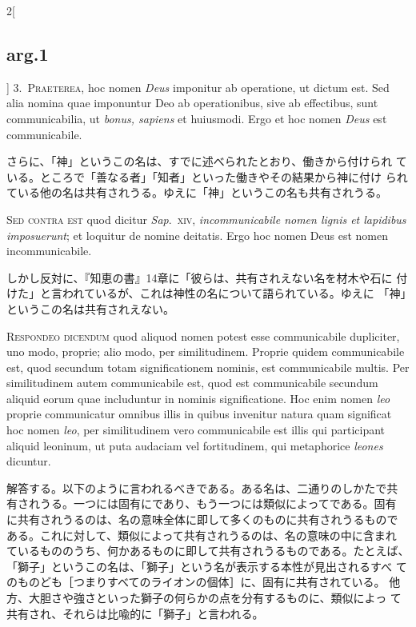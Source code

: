 \documentclass[paper=a4paper,fontsize=10pt,jafontsize=9pt,titlepage]{jlreq}
\begin{document}
\begin{paracol}{2}[\subsection{arg.1}]
3.~{\scshape Praeterea}, hoc nomen {\itshape Deus} imponitur ab
operatione, ut dictum est. Sed alia nomina quae imponuntur Deo ab
operationibus, sive ab effectibus, sunt communicabilia, ut {\itshape
bonus, sapiens} et huiusmodi. Ergo et hoc nomen {\itshape Deus} est
communicabile.

\switchcolumn

さらに、「神」というこの名は、すでに述べられたとおり、働きから付けられ
ている。ところで「善なる者」「知者」といった働きやその結果から神に付け
られている他の名は共有されうる。ゆえに「神」というこの名も共有されうる。

\switchcolumn*[\subsection{s.c.}]

{\scshape Sed contra est} quod dicitur {\itshape Sap}.~{\scshape xiv},
{\itshape incommunicabile nomen lignis et lapidibus imposuerunt}; et
loquitur de nomine deitatis. Ergo hoc nomen Deus est nomen
incommunicabile.

\switchcolumn

しかし反対に、『知恵の書』14章に「彼らは、共有されえない名を材木や石に
付けた」と言われているが、これは神性の名について語られている。ゆえに
「神」というこの名は共有されえない。


{\scshape Respondeo dicendum} quod aliquod nomen potest esse
communicabile dupliciter, uno modo, proprie; alio modo, per
similitudinem. Proprie quidem communicabile est, quod secundum totam
significationem nominis, est communicabile multis. Per similitudinem
autem communicabile est, quod est communicabile secundum aliquid eorum
quae includuntur in nominis significatione. Hoc enim nomen {\itshape
leo} proprie communicatur omnibus illis in quibus invenitur natura
quam significat hoc nomen {\itshape leo}, per similitudinem vero
communicabile est illis qui participant aliquid leoninum, ut puta
audaciam vel fortitudinem, qui metaphorice {\itshape leones} dicuntur.

\switchcolumn

解答する。以下のように言われるべきである。ある名は、二通りのしかたで共
有されうる。一つには固有にであり、もう一つには類似によってである。固有
に共有されうるのは、名の意味全体に即して多くのものに共有されうるもので
ある。これに対して、類似によって共有されうるのは、名の意味の中に含まれ
ているもののうち、何かあるものに即して共有されうるものである。たとえば、
「獅子」というこの名は、「獅子」という名が表示する本性が見出されるすべ
てのものども［つまりすべてのライオンの個体］に、固有に共有されている。
他方、大胆さや強さといった獅子の何らかの点を分有するものに、類似によっ
て共有され、それらは比喩的に「獅子」と言われる。


\end{paracol}
\end{document}
